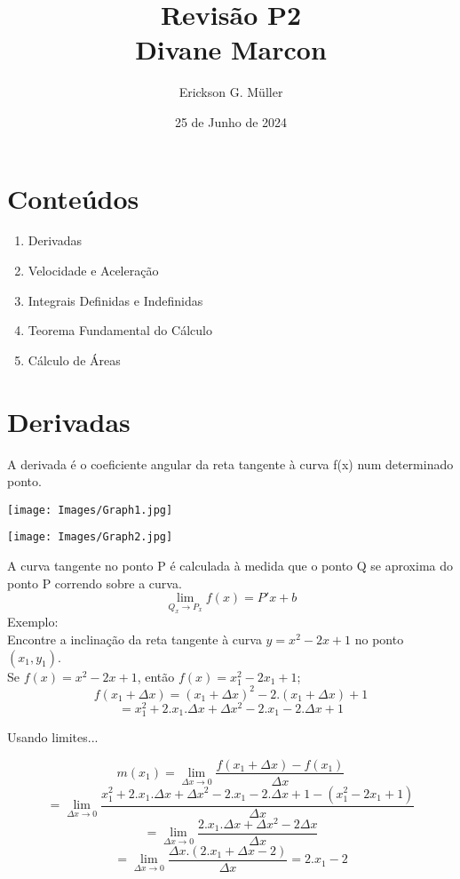 \documentclass[ ]{article}
\title{Revisão P2 \\ Divane Marcon}
\author{Erickson G. Müller}
\date{25 de Junho de 2024}
\begin{document}
\maketitle

\section{Conteúdos}
	\begin{enumerate}
		\item Derivadas
		\item Velocidade e Aceleração
		\item Integrais Definidas e Indefinidas
		\item Teorema Fundamental do Cálculo
		\item Cálculo de Áreas
	\end{enumerate}
\newpage

\section{Derivadas}
	A derivada é o coeficiente angular da reta tangente à curva f(x) num determinado ponto.\\
	
	\begin{minipage}{6 cm}
		\texttt{[image: Images/Graph1.jpg]}
	\end{minipage}		
	\begin{minipage}{6 cm}
		\texttt{[image: Images/Graph2.jpg]}
	\end{minipage}
	
	A curva tangente no ponto P	é calculada à medida que o ponto Q se aproxima do ponto P correndo sobre a curva.
	$$\lim_{Q_x\to P_x}f(x)=P'x+b$$
	Exemplo:\\
	Encontre a inclinação da reta tangente à curva $y=x^2-2x+1$ no ponto $(x_1,y_1)$.\\
	
	Se $f(x)=x^2-2x+1$, então $f(x)=x_1^2-2x_1+1$;\\
	$$f(x_1+\Delta x)=(x_1+\Delta x)^2 -2.(x_1+\Delta x) + 1$$
	$$=x_1^2+2.x_1.\Delta x + \Delta x^2 - 2.x_1 -2.\Delta x +1$$
	
	Usando limites...
	
	$$m(x_1) = \lim_{\Delta x \to 0}\dfrac{f(x_1+\Delta x)-f(x_1)}{\Delta x}$$
	$$=\lim_{\Delta x\to 0}\dfrac{x_1^2+2.x_1.\Delta x + \Delta x^2 - 2.x_1 -2.\Delta x +1 - (x_1^2-2x_1+1)}{\Delta x}$$
	$$=\lim_{\Delta x\to 0}\dfrac{2.x_1.\Delta x + \Delta x^2-2\Delta x}{\Delta x}$$
	$$ = \lim_{\Delta x\to 0}\dfrac{\Delta x.(2.x_1+\Delta x -2)}{\Delta x} = 2.x_1 - 2$$
	
\end{document}
